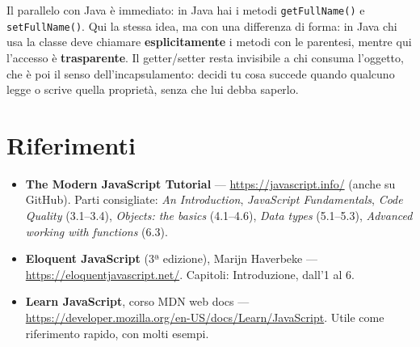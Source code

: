 \documentclass[10pt,a4paper]{article}
\begin{document}
Il parallelo con Java è immediato: in Java hai i metodi \texttt{getFullName()} e \texttt{setFullName()}. Qui la stessa idea, ma con una differenza di forma: in Java chi usa la classe deve chiamare \textbf{esplicitamente} i metodi con le parentesi, mentre qui l'accesso è \textbf{trasparente}. Il getter/setter resta invisibile a chi consuma l'oggetto, che è poi il senso dell'incapsulamento: decidi tu cosa succede quando qualcuno legge o scrive quella proprietà, senza che lui debba saperlo.

\section{Riferimenti}

\begin{itemize}
  \item \textbf{The Modern JavaScript Tutorial} --- \url{https://javascript.info/} (anche su GitHub). Parti consigliate: \emph{An Introduction}, \emph{JavaScript Fundamentals}, \emph{Code Quality} (3.1--3.4), \emph{Objects: the basics} (4.1--4.6), \emph{Data types} (5.1--5.3), \emph{Advanced working with functions} (6.3).
  \item \textbf{Eloquent JavaScript} (3ª edizione), Marijn Haverbeke --- \url{https://eloquentjavascript.net/}. Capitoli: Introduzione, dall'1 al 6.
  \item \textbf{Learn JavaScript}, corso MDN web docs --- \url{https://developer.mozilla.org/en-US/docs/Learn/JavaScript}. Utile come riferimento rapido, con molti esempi.
\end{itemize}
\end{document}
